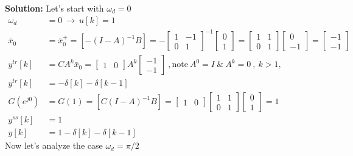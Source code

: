 \documentclass[twoside]{article}
\begin{document}
\textbf{Solution:} Let's start with $\omega_d = 0$
%
\begin{align*} 
    \omega_d &= 0 \ \rightarrow \ u[k] = 1
    \\[1ex]
    \bar{x}_0 &= \bar{x}_0^+ = \left[ - (I - A)^{-1} B \right] = - \begin{bmatrix} 1 & -1 \\ 0 & 1 \end{bmatrix}^{-1} \begin{bmatrix} 0 \\ 1 \end{bmatrix} = 
     \begin{bmatrix} 1 & 1 \\ 0 & 1 \end{bmatrix} \begin{bmatrix} 0 \\ -1 \end{bmatrix} = \begin{bmatrix} -1 \\ -1 \end{bmatrix} 
     \\[1ex]
     y^{tr}[k] &= C A^k \bar{x}_0 = \begin{bmatrix} 1 & 0 \end{bmatrix} A^k \begin{bmatrix} -1 \\ -1 \end{bmatrix} \ ,  \mathrm{note} \  A^0 = I \ \& \ A^k = 0 \ , \ k > 1 ,
     \\[1ex]
     y^{tr}[k] &= - \delta[k]  - \delta[k-1]
     \\[1ex]
     G(e^{j 0 }) &= G(1) = \left[ C (I - A)^{-1} B \right] = \begin{bmatrix} 1 & 0 \end{bmatrix} \begin{bmatrix} 1 & 1 \\ 0 & 1 \end{bmatrix} \begin{bmatrix} 0 \\ 1 \end{bmatrix} = 1
     \\[1ex]
     y^{ss}[k] &= 1
     \\[1ex]
     y[k] &= 1 - \delta[k]  - \delta[k-1]
\end{align*}
%
Now let's analyze the case  $\omega_d = \pi/2$
\end{document}
